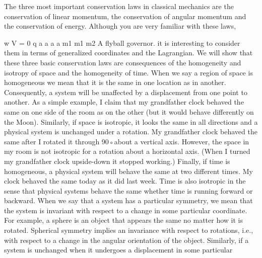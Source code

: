 The three most important conservation laws in classical mechanics are the conservation of linear momentum, the conservation of angular momentum and
the conservation of energy. Although you are very familiar with these laws,

w
V = 0
q
a
a
a
a
m1
m1
m2
A flyball governor.
it is interesting to consider them in terms of generalized coordinates and the
Lagrangian. We will show that these three basic conservation laws are consequences of the homogeneity and isotropy of space and the homogeneity
of time.
When we say a region of space is homogeneous we mean that it is the same
in one location as in another. Consequently, a system will be unaffected by a
displacement from one point to another. As a simple example, I claim that my
grandfather clock behaved the same on one side of the room as on the other
(but it would behave differently on the Moon).
Similarly, if space is isotropic, it looks the same in all directions and a physical system is unchanged under a rotation. My grandfather clock behaved the
same after I rotated it through 90◦about a vertical axis. However, the space in
my room is not isotropic for a rotation about a horizontal axis. (When I turned
my grandfather clock upside-down it stopped working.)
Finally, if time is homogeneous, a physical system will behave the same at
two different times. My clock behaved the same today as it did last week.
Time is also isotropic in the sense that physical systems behave the same
whether time is running forward or backward.
When we say that a system has a particular symmetry, we mean that the
system is invariant with respect to a change in some particular coordinate.
For example, a sphere is an object that appears the same no matter how it
is rotated. Spherical symmetry implies an invariance with respect to rotations,
i.e., with respect to a change in the angular orientation of the object. Similarly,
if a system is unchanged when it undergoes a displacement in some particular

